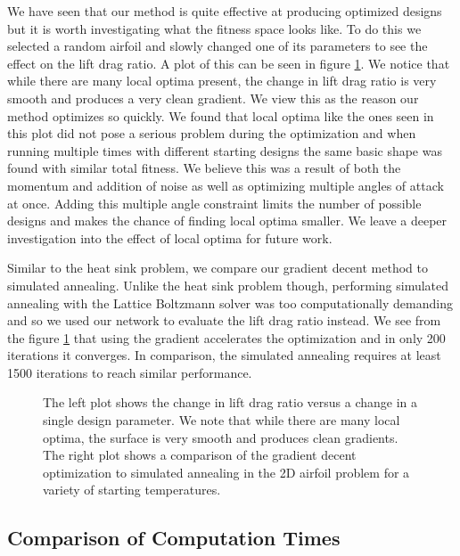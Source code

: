\documentclass{article} %
\begin{document}
We have seen that our method is quite effective at producing optimized designs but it is worth investigating what the fitness space looks like. To do this we selected a random airfoil and slowly changed one of its parameters to see the effect on the lift drag ratio. A plot of this can be seen in figure \ref{boundary_space_explore}. We notice that while there are many local optima present, the change in lift drag ratio is very smooth and produces a very clean gradient. We view this as the reason our method optimizes so quickly. We found that local optima like the ones seen in this plot did not pose a serious problem during the optimization and when running multiple times with different starting designs the same basic shape was found with similar total fitness. We believe this was a result of both the momentum and addition of noise as well as optimizing multiple angles of attack at once. Adding this multiple angle constraint limits the number of possible designs and makes the chance of finding local optima smaller. We leave a deeper investigation into the effect of local optima for future work.

Similar to the heat sink problem, we compare our gradient decent method to simulated annealing. Unlike the heat sink problem though, performing simulated annealing with the Lattice Boltzmann solver was too computationally demanding and so we used our network to evaluate the lift drag ratio instead. We see from the figure \ref{boundary_space_explore} that using the gradient accelerates the optimization and in only 200 iterations it converges. In comparison, the simulated annealing requires at least 1500 iterations to reach similar performance.

\begin{figure}[h]
\begin{center}
\end{center}
\label{boundary_space_explore}
\caption{The left plot shows the change in lift drag ratio versus a change in a single design parameter. We note that while there are many local optima, the surface is very smooth and produces clean gradients. The right plot shows a comparison of the gradient decent optimization to simulated annealing in the 2D airfoil problem for a variety of starting temperatures.}
\end{figure}

\subsection{Comparison of Computation Times}
\end{document}
